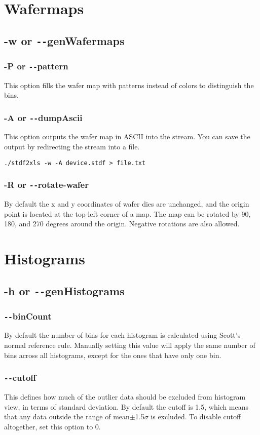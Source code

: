 \documentclass[letterpaper]{article}
\begin{document}
\section{Wafermaps}
\subsection{\bf -w or \texttt{-{}-}genWafermaps}
\subsubsection{\bf -P or \texttt{-{}-}pattern}
This option fills the wafer map with patterns instead of colors to distinguish the bins.
\subsubsection{\bf -A or \texttt{-{}-}dumpAscii}
This option outputs the wafer map in ASCII into the stream. You can save the output by redirecting the stream into a file.
\begin{verbatim}
./stdf2xls -w -A device.stdf > file.txt
\end{verbatim}
\subsubsection{\bf -R or \texttt{-{}-}rotate-wafer}
By default the x and y coordinates of wafer dies are unchanged, and the origin point is located at the top-left corner of a map. The map can be rotated by 90, 180, and 270 degrees around the origin. Negative rotations are also allowed.

\section{Histograms}
\subsection{\bf -h or \texttt{-{}-}genHistograms}
\subsubsection{\bf \texttt{-{}-}binCount}
By default the number of bins for each histogram is calculated using Scott's normal reference rule. Manually setting this value will apply the same number of bins across all histograms, except for the ones that have only one bin.
\subsubsection{\bf \texttt{-{}-}cutoff}
This defines how much of the outlier data should be excluded from histogram view, in terms of standard deviation. By default the cutoff is 1.5, which means that any data outside the range of mean$\pm$1.5$\sigma$ is excluded. To disable cutoff altogether, set this option to 0.
\end{document}
